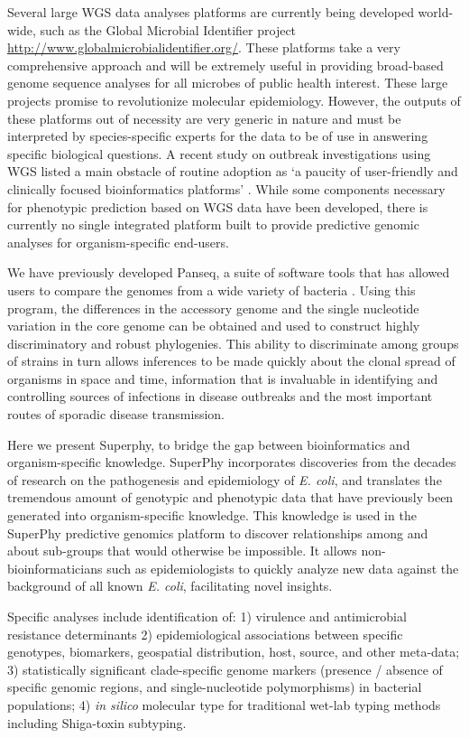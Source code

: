 \documentclass[doublespacing, linenumbers]{bmcart}
\begin{document}
Several large WGS data analyses platforms are currently being developed world-wide, such as the Global Microbial Identifier project \url{http://www.globalmicrobialidentifier.org/}. These platforms take a very comprehensive approach and will be extremely useful in providing broad-based genome sequence analyses for all microbes of public health interest. These large projects promise to revolutionize molecular epidemiology. However, the outputs of these platforms out of necessity are very generic in nature and must be interpreted by species-specific experts for the data to be of use in answering specific biological questions. A recent study on outbreak investigations using WGS listed a main obstacle of routine adoption as `a paucity of user-friendly and clinically focused bioinformatics platforms'  \cite{sherry_outbreak_2013}. While some components necessary for phenotypic prediction based on WGS data have been developed, there is currently no single integrated platform built to provide predictive genomic analyses for organism-specific end-users.

We have previously developed Panseq, a suite of software tools that has allowed users to compare the genomes from a wide variety of bacteria \cite{laing_pan-genome_2010}. Using this program, the differences in the accessory genome and the single nucleotide variation in the core genome can be obtained and used to construct highly discriminatory and robust phylogenies. This ability to discriminate among groups of strains in turn allows inferences to be made quickly about the clonal spread of organisms in space and time, information that is invaluable in identifying and controlling sources of infections in disease outbreaks and the most important routes of sporadic disease transmission. 

Here we present Superphy, to bridge the gap between bioinformatics and organism-specific knowledge. SuperPhy incorporates discoveries from the decades of research on the pathogenesis and epidemiology of \textit{E. coli}, and translates the tremendous amount of genotypic and phenotypic data that have previously been generated into organism-specific knowledge. This knowledge is used in the SuperPhy predictive genomics platform to discover relationships among and about sub-groups that would otherwise be impossible. It allows non-bioinformaticians such as epidemiologists to quickly analyze new data against the background of all known \textit{E. coli}, facilitating novel insights.

Specific analyses include identification of: 1) virulence and antimicrobial resistance determinants 2) epidemiological associations between specific genotypes, biomarkers, geospatial distribution, host, source, and other meta-data; 3) statistically significant clade-specific genome markers (presence / absence of specific genomic regions, and single-nucleotide polymorphisms) in bacterial populations; 4) \textit{in silico} molecular type for traditional wet-lab typing methods including Shiga-toxin subtyping.
\end{document}
